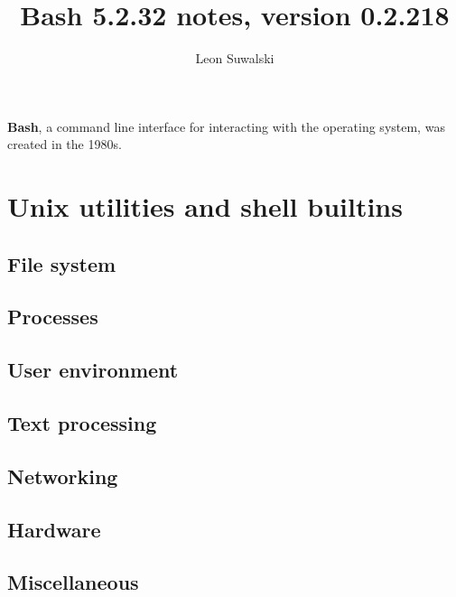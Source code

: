 \documentclass{charun}
\title{Bash 5.2.32 notes, version 0.2.218}
\author{Leon Suwalski}
\begin{document}
\begin{multicols*}{3}
\maketitle
\raggedright

\textbf{Bash}, a command line interface for interacting with the operating system, was created in the 1980s.










\newpage
\section{Unix utilities and shell builtins}
\subsection{File system}


\subsection{Processes}


\subsection{User environment}


\subsection{Text processing}


\subsection{Networking}


\subsection{Hardware}


\subsection{Miscellaneous}


\end{multicols*}
\end{document}
